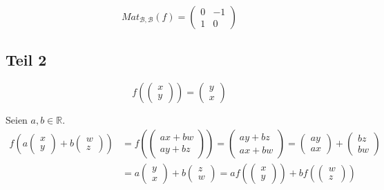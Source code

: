 \documentclass[a4paper,10pt]{article}
\begin{document}
\begin{equation}
 Mat_{\mathcal{B}, \mathcal{B}}(f) = \begin{pmatrix}
                                      0 & -1\\
                                      1 & 0
                                     \end{pmatrix}
\end{equation}

\subsection*{Teil 2}

\begin{equation}
 f(\begin{pmatrix}x\\y\end{pmatrix}) = \begin{pmatrix}y\\x\end{pmatrix}
\end{equation}

Seien $a, b \in \mathbb{R}$.
\begin{align*}
 f(a\begin{pmatrix}x\\y\end{pmatrix} + b\begin{pmatrix}w\\z\end{pmatrix}) & = f(\begin{pmatrix}ax + bw\\ay + bz\end{pmatrix}) = \begin{pmatrix}ay + bz\\ax + bw\end{pmatrix} = \begin{pmatrix}ay\\ax\end{pmatrix} + \begin{pmatrix}bz\\bw\end{pmatrix}\\
 & = a\begin{pmatrix}y\\x\end{pmatrix} + b\begin{pmatrix}z\\w\end{pmatrix} = af(\begin{pmatrix}x\\y\end{pmatrix}) + bf(\begin{pmatrix}w\\z\end{pmatrix})
\end{align*}
\end{document}
